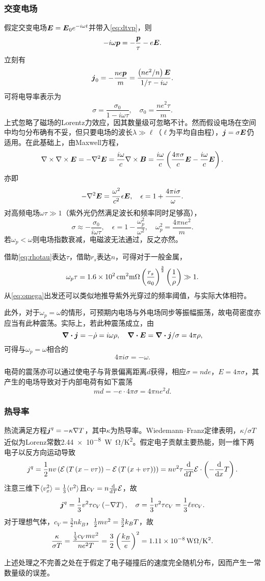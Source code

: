 \documentclass{ctexart}
\begin{document}
\subsubsection{交变电场}
假定交变电场$\boldsymbol{E}=\boldsymbol{E}_0e^{-i\omega t}$并带入\eqref{eq:dtvp}，则
\[ -i\omega\boldsymbol{p}=-\frac{\boldsymbol{p}}{\tau}-e\boldsymbol{E}. \]
立刻有
\[ \boldsymbol{j}_0 = -\frac{ne\boldsymbol{p}}{m} = \frac{\left(ne^2/n\right)\boldsymbol{E}}{1/\tau-i\omega}. \]
可将电导率表示为
\[ \sigma = \frac{\sigma_0}{1-i\omega\tau}, \quad \sigma_0 = \frac{ne^2\tau}{m}. \]
上式忽略了磁场的Lorentz力效应，因其数量级可忽略不计。然而假设电场在空间中均匀分布确有不妥，但只要电场的波长$\lambda \gg
 \ell$（$\ell$为平均自由程），$\boldsymbol{j} = \sigma \boldsymbol{E}$仍适用。在此基础上，由Maxwell方程，
 \[ \nabla\times\nabla\times\boldsymbol{E} = -\nabla^2\boldsymbol{E} = \frac{i\omega}{c}\nabla\times\boldsymbol{B} = \frac{i\omega}{c}\left(\frac{4\pi\sigma}{c}\boldsymbol{E}-\frac{i\omega}{c}\boldsymbol{E}\right). \]
 亦即
 \[ -\nabla^2\boldsymbol{E} = \frac{\omega^2}{c^2}\epsilon\boldsymbol{E}, \quad \epsilon = 1+\frac{4\pi i \sigma}{\omega}. \]
 对高频电场$\omega\tau\gg 1$（紫外光仍然满足波长和频率同时足够高），
 \begin{equation}
 \label{eq:omega}
 \sigma\approx-\frac{\sigma_0}{i\omega\tau},\quad \epsilon = 1-\frac{\omega_p^2}{\omega^2}, \quad \omega_p^2 = \frac{4\pi ne^2}{m}.
 \end{equation}
 若$\omega_p<\omega$则电场指数衰减，电磁波无法通过，反之亦然。
 \par
 借助\eqref{eq:rhotau}表达$\tau$，借助$r_s$表达$n$，可得对于一般金属，
 \[ \omega_p \tau = \SI{1.6e2}{cm^2 m\ohm}\left(\frac{r_s}{a_0}\right)^{\frac{3}{2}}\left(\frac{1}{\rho}\right)\gg 1. \]
从\eqref{eq:omega}出发还可以类似地推导紫外光穿过的频率阈值，与实际大体相符。
\par
此外，对于$\omega_p=\omega$的情形，可预期内电场与外电场同步等振幅振荡，故电荷密度亦应当有此种震荡。实际上，若此种震荡成立，由
\[ \div \boldsymbol{j} = -\dot{\rho} = i\omega\rho,\quad \div \boldsymbol{E} = \div \boldsymbol{j}/\sigma = 4\pi\rho, \]
可得与$\omega_p=\omega$相合的
\[ 4\pi i \sigma = -\omega. \]
\par
电荷的震荡亦可以通过使电子与背景偏离距离$d$获得，相应$\sigma=nde$，$E=4\pi\sigma$，其产生的电场导致对于内部电荷有如下震荡
\[ m\ddot{d} = -e\cdot 4\pi\sigma = 4\pi ne^2 d. \]
\subsubsection{热导率}
热流满足方程$\boldsymbol{j}^q=-\kappa\nabla T$，其中$\kappa$为热导率。Wiedemann–Franz定律表明，$\kappa/\sigma T$近似为Lorenz常数\SI{2.44e-8}{W \ohm/K^2}。假定电子贡献主要热能，则一维下两电子以反方向运动导致
\[ j^q = \frac{1}{2} nv\left(\mathcal{E}\left(T\left(x-v\tau\right)\right) - \mathcal{E}\left(T\left(x+v\tau\right)\right)\right) = nv^2\tau\frac{\mathrm{d}}{\mathrm{d} T} \mathcal{E} \cdot \left(-\frac{\mathrm{d}}{\mathrm{d} x} T\right). \]
注意三维下$\langle v_x^2\rangle = \frac{1}{3}\langle v^2\rangle$且$c_V=n\frac{\mathrm{d}}{\mathrm{d} T} \mathcal{E}$，故
\[ \boldsymbol{j}^q = \frac{1}{3}v^2\tau c_V\left(-\nabla T\right), \quad \sigma = \frac{1}{3}v^2\tau c_V = \frac{1}{3}\ell vc_V. \]
对于理想气体，$c_V=\frac{3}{2}nk_B$，$\frac{1}{2} mv^2 = \frac{3}{2}k_BT$，故
\[ \frac{\kappa}{\sigma T} = \frac{\frac{1}{3}c_V mv^2}{ne^2 T} = \frac{3}{2}\left(\frac{k_B}{e}\right)^2 = \SI{1.11e-8}{W\ohm/K^2}. \]
\par
上述处理之不完善之处在于假定了电子碰撞后的速度完全随机分布，因而产生一常数量级的误差\cite{concepts}。
\end{document}
